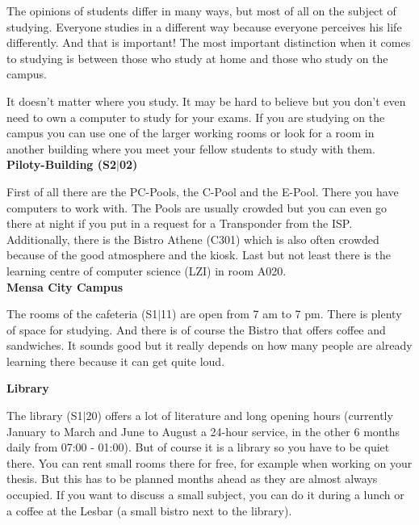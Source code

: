{The opinions of students differ in many ways, but most of all on the subject of studying. Everyone studies in a different way because everyone perceives his life differently. And that is important! The most important distinction when it comes to studying is between those who study at home and those who study on the campus.
}{
%
It doesn't matter where you study. It may be hard to believe but you don't even need to own a computer to study for your exams. If you are studying on the campus you can use one of the larger working rooms or look for a room in another building where you meet your fellow students to study with them.\\

\noindent\textbf{Piloty-Building (S2$|$02)}

First of all there are the PC-Pools, the C-Pool and the E-Pool. There you have computers to work with. The Pools are usually crowded but you can even go there at night if you put in a request for a Transponder from the ISP. Additionally, there is the Bistro Athene (C301) which is also often crowded because of the good atmosphere and the kiosk. Last but not least there is the learning centre of computer science (LZI) in room A020.\\

\noindent\textbf{Mensa City Campus}

The rooms of the cafeteria (S1$|$11) are open from 7 am to 7 pm. There is plenty of space for studying. And there is of course the Bistro that offers coffee and sandwiches. It sounds good but it really depends on how many people are already learning there because it can get quite loud.\\


\noindent\textbf{Library}

The library (S1$|$20) offers a lot of literature and long opening hours (currently January to March and June to August a 24-hour service, in the other 6 months daily from 07:00 - 01:00). But of course it is a library so you have to be quiet there. You can rent small rooms there for free, for example when working on your thesis. But this has to be planned months ahead as they are almost always occupied. If you want to discuss a small subject, you can do it during a lunch or a coffee at the Lesbar (a small bistro next to the library).\\

}
